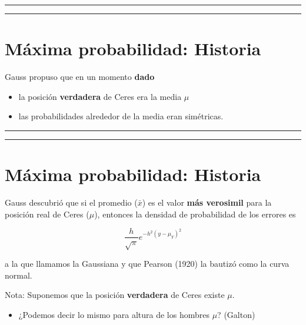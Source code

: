 \documentclass[
]{book}
\providecommand{\tightlist}{%
  \setlength{\itemsep}{0pt}\setlength{\parskip}{0pt}}
\begin{document}
\begin{center}\rule{0.5\linewidth}{0.5pt}\end{center}

\begin{center}\rule{0.5\linewidth}{0.5pt}\end{center}

\hypertarget{muxe1xima-probabilidad-historia-1}{%
\section{Máxima probabilidad: Historia}\label{muxe1xima-probabilidad-historia-1}}

Gauss propuso que en un momento \textbf{dado}

\begin{itemize}
\tightlist
\item
  la posición \textbf{verdadera} de Ceres era la media \(\mu\)
\item
  las probabilidades alrededor de la media eran simétricas.
\end{itemize}

\begin{center}\rule{0.5\linewidth}{0.5pt}\end{center}

\begin{center}\rule{0.5\linewidth}{0.5pt}\end{center}

\hypertarget{muxe1xima-probabilidad-historia-2}{%
\section{Máxima probabilidad: Historia}\label{muxe1xima-probabilidad-historia-2}}

Gauss descubrió que si el promedio (\(\bar{x}\)) es el valor \textbf{más verosimil} para la posición real de Ceres (\(\mu\)), entonces la densidad de probabilidad de los errores es

\[\frac{h}{\sqrt{\pi}}e^{-h^2(y-\mu_Y)^2}\]

a la que llamamos la Gaussiana y que Pearson (1920) la bautizó como la curva normal.

Nota: Suponemos que la posición \textbf{verdadera} de Ceres existe \(\mu\).

\begin{itemize}
\tightlist
\item
  ¿Podemos decir lo mismo para altura de los hombres \(\mu\)? (Galton)
\end{itemize}
\end{document}

